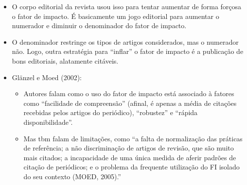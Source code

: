 \documentclass[11pt]{article}
\begin{document}
\begin{itemize}
\item O corpo editorial da revista usou isso para tentar aumentar de forma forçosa o fator de impacto. É basicamente um jogo editorial para aumentar o numerador e diminuir o denominador do fator de impacto.

\item O denominador restringe os tipos de artigos considerados, mas o numerador não. Logo, outra estratégia para ``inflar'' o fator de impacto é a publicação de bons editoriais, alatamente citáveis.

\item Glänzel e Moed (2002):

\begin{itemize}
\item Autores falam como o uso do fator de impacto está associado à fatores como ``facilidade de compreensão'' (afinal, é apenas a média de citações recebidas pelos artigos do periódico), ``robustez'' e ``rápida disponibilidade''.

\item Mas tbm falam de limitações, como ``a falta de normalização das práticas de referência; a não discriminação de artigos de revisão, que são muito mais citados; a incapacidade de uma única medida de aferir padrões de citação de periódicos; e o problema da frequente utilização do FI isolado do seu contexto (MOED, 2005).''
\end{itemize}
\end{itemize}
\end{document}
